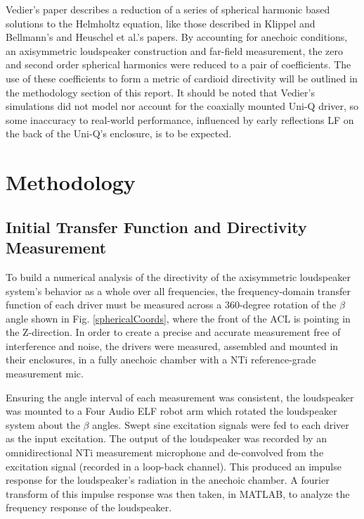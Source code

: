 \documentclass{report}
\begin{document}
        \newpage

        Vedier's paper describes a reduction of a series of spherical harmonic based solutions to the Helmholtz equation, like those described in Klippel and Bellmann's and Heuschel et al.'s papers.
        By accounting for anechoic conditions, an axisymmetric loudspeaker construction and far-field measurement, the zero and second order spherical harmonics were reduced to a pair of coefficients.
        The use of these coefficients to form a metric of cardioid directivity will be outlined in the methodology section of this report.
        It should be noted that Vedier's simulations did not model nor account for the coaxially mounted Uni-Q driver, so some inaccuracy to real-world performance, influenced by early reflections LF on the back of the Uni-Q's enclosure, is to be expected.

\chapter{Methodology}
    \section{Initial Transfer Function and Directivity Measurement}
        To build a numerical analysis of the directivity of the axisymmetric loudspeaker system's behavior as a whole over all frequencies, the frequency-domain transfer function of each driver must be measured across a 360-degree rotation of the $\beta$ angle shown in Fig. \ref{sphericalCoords}, where the front of the ACL is pointing in the Z-direction.
        In order to create a precise and accurate measurement free of interference and noise, the drivers were measured, assembled and mounted in their enclosures, in a fully anechoic chamber with a NTi reference-grade measurement mic.

        Ensuring the angle interval of each measurement was consistent, the loudspeaker was mounted to a Four Audio ELF robot arm which rotated the loudspeaker system about the $\beta$ angles.
        Swept sine excitation signals were fed to each driver as the input excitation.
        The output of the loudspeaker was recorded by an omnidirectional NTi measurement microphone and de-convolved from the excitation signal (recorded in a loop-back channel).
        This produced an impulse response for the loudspeaker's radiation in the anechoic chamber.
        A fourier transform of this impulse response was then taken, in MATLAB, to analyze the frequency response of the loudspeaker.
\end{document}
